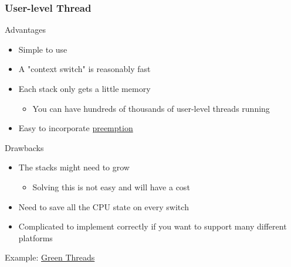 \begin{frame}[fragile]
    \frametitle{User-level Thread}
% 
% 
% 
{\color{red}Advantages}
 
     \begin{itemize}
         \item Simple to use
         \item A "context switch" is reasonably fast
         \item Each stack only gets a little memory
     	\begin{itemize}
     	    \item You can have hundreds of thousands of user-level threads running
       \end{itemize}
         \item Easy to incorporate \href{https://cfsamson.gitbook.io/green-threads-explained-in-200-lines-of-rust/green-threads#preemptive-multitasking}{preemption}
     \end{itemize}
 
{\color{red}Drawbacks}
 
    \begin{itemize}
        \item The stacks might need to grow
    	\begin{itemize}
    	    \item Solving this is not easy and will have a cost
      \end{itemize}
        \item Need to save all the CPU state on every switch
        \item Complicated to implement correctly if you want to support many different platforms
    \end{itemize}

Example: \href{https://cfsamson.github.io/books-futures-explained/0_background_information.html#green-threads}{Green Threads}

\end{frame}
